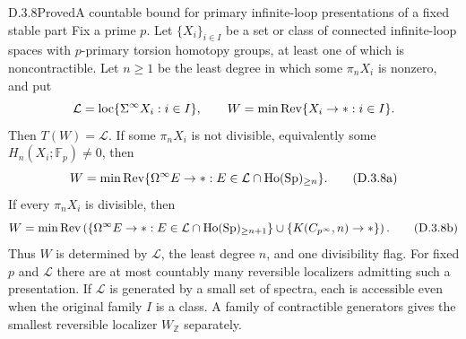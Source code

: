 \begin{claim}{D.3.8}{Proved}{A countable bound for primary infinite-loop presentations of a fixed stable part}
Fix a prime $p$. Let $\{X_i\}_{i\in I}$ be a set or class of
connected infinite-loop spaces with $p$-primary torsion homotopy
groups, at least one of which is noncontractible. Let $n\geq1$
be the least degree in which some $\pi_nX_i$ is nonzero, and put
\[
 \mathcal L=\operatorname{loc}\{\Sigma^\infty X_i:i\in I\},\qquad
 W=\min\mathrm{Rev}\{X_i\to *:i\in I\}.
\]
Then $T(W)=\mathcal L$. If some $\pi_nX_i$ is not divisible,
equivalently some $H_n(X_i;\mathbb F_p)\ne0$, then
\[
 W=\min\mathrm{Rev}
   \{\Omega^\infty E\to *:
                         E\in\mathcal L\cap\operatorname{Ho}(\mathrm{Sp})_{\geq n}\}.
 \tag{D.3.8a}
\]
If every $\pi_nX_i$ is divisible, then
\[
 W=\min\mathrm{Rev}\left(
   \{\Omega^\infty E\to *:
                   E\in\mathcal L\cap\operatorname{Ho}(\mathrm{Sp})_{\geq n+1}\}
       \cup\{K(C_{p^\infty},n)\to *\}\right).
 \tag{D.3.8b}
\]
Thus $W$ is determined by $\mathcal L$, the least degree $n$,
and one divisibility flag. For fixed $p$ and $\mathcal L$ there
are at most countably many reversible localizers admitting such
a presentation. If $\mathcal L$ is generated by a small set of
spectra, each is accessible even when the original family $I$
is a class. A family of contractible generators gives the
smallest reversible localizer $W_{\mathbb Z}$ separately.
\end{claim}

